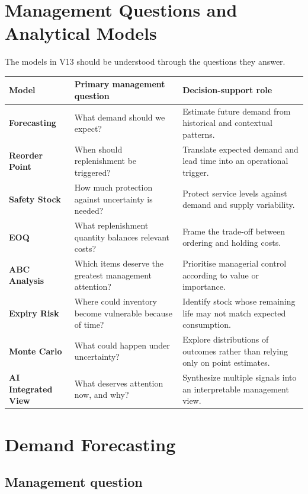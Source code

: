 \documentclass[11pt,a4paper]{article}
\begin{document}
\section{Management Questions and Analytical Models}

The models in V13 should be understood through the questions they answer.

\begin{center}
\renewcommand{\arraystretch}{1.45}
\begin{tabularx}{\textwidth}{>{\bfseries}p{34mm} X X}
\toprule
Model & Primary management question & Decision-support role \\
\midrule
Forecasting & What demand should we expect? &
Estimate future demand from historical and contextual patterns. \\
Reorder Point & When should replenishment be triggered? &
Translate expected demand and lead time into an operational trigger. \\
Safety Stock & How much protection against uncertainty is needed? &
Protect service levels against demand and supply variability. \\
EOQ & What replenishment quantity balances relevant costs? &
Frame the trade-off between ordering and holding costs. \\
ABC Analysis & Which items deserve the greatest management attention? &
Prioritise managerial control according to value or importance. \\
Expiry Risk & Where could inventory become vulnerable because of time? &
Identify stock whose remaining life may not match expected consumption. \\
Monte Carlo & What could happen under uncertainty? &
Explore distributions of outcomes rather than relying only on point estimates. \\
AI Integrated View & What deserves attention now, and why? &
Synthesize multiple signals into an interpretable management view. \\
\bottomrule
\end{tabularx}
\end{center}

\section{Demand Forecasting}

\subsection{Management question}
\end{document}
